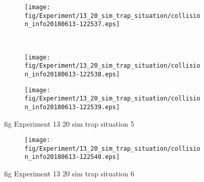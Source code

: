 \begin{figure}[H]
	\centering
	\begin{subfigure}[b]{0.45\textwidth}
		\texttt{[image: fig/Experiment/13\_20\_sim\_trap\_situation/collision\_info20180613-122537.eps]}
		\caption{}
		\label{fig:Experiment:13_20_sim_trap_situation:collision_info20180613-122537}
	\end{subfigure}
	~
	\begin{subfigure}[b]{0.45\textwidth}
		\texttt{[image: fig/Experiment/13\_20\_sim\_trap\_situation/collision\_info20180613-122538.eps]}
		\caption{}
		\label{fig:Experiment:13_20_sim_trap_situation:collision_info20180613-122538}
	\end{subfigure}

	\begin{subfigure}[b]{0.45\textwidth}
		\texttt{[image: fig/Experiment/13\_20\_sim\_trap\_situation/collision\_info20180613-122539.eps]}
		\caption{}
		\label{fig:Experiment:13_20_sim_trap_situation:collision_info20180613-122539}
	\end{subfigure}
	\caption{fig Experiment 13 20 sim trap situation 5}
	\label{fig:Experiment:13_20_sim_trap_situation:5}
\end{figure}

\begin{figure}[H]
	\centering
	\begin{subfigure}[b]{0.45\textwidth}
		\texttt{[image: fig/Experiment/13\_20\_sim\_trap\_situation/collision\_info20180613-122540.eps]}
		\caption{}
		\label{fig:Experiment:13_20_sim_trap_situation:collision_info20180613-122540}
	\end{subfigure}
	\caption{fig Experiment 13 20 sim trap situation 6}
	\label{fig:Experiment:13_20_sim_trap_situation:6}
\end{figure}

